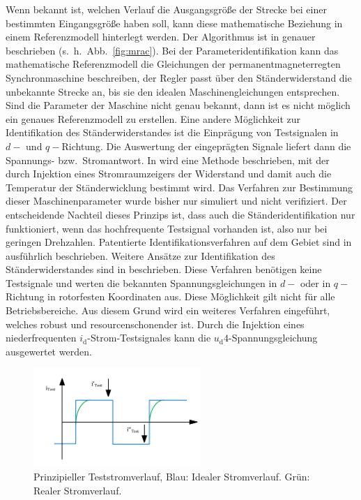 \documentclass[conference,twocolumn]{IEEEtran}
\newcommand{\x}[1]{\mathrm{#1}}
\begin{document}
Wenn bekannt ist, welchen Verlauf die Ausgangsgröße der Strecke bei einer bestimmten Eingangsgröße haben soll, kann diese mathematische Beziehung in einem Referenzmodell hinterlegt werden.
Der Algorithmus ist in \autocite{slotine_applied_1991} genauer beschrieben (s.~h.~Abb.~\ref{fig:mrac}).
Bei der Parameteridentifikation kann das mathematische Referenzmodell die Gleichungen der permanentmagneterregten Synchronmaschine beschreiben, der Regler passt über den Ständerwiderstand die unbekannte Strecke an, bis sie den idealen Maschinengleichungen entsprechen.
Sind die Parameter der Maschine nicht genau bekannt, dann ist es nicht möglich ein genaues Referenzmodell zu erstellen.
Eine andere Möglichkeit zur Identifikation des Ständerwiderstandes ist die Einprägung von Testsignalen in $d-$ und $q-$Richtung.
Die Auswertung der eingeprägten Signale liefert dann die Spannungs- bzw.\ Stromantwort.
In \autocite{wilson2005} wird eine Methode beschrieben, mit der durch Injektion eines Stromraumzeigers der Widerstand und damit auch die Temperatur der Ständerwicklung bestimmt wird.
Das Verfahren zur Bestimmung dieser Maschinenparameter wurde bisher nur simuliert und nicht verifiziert.
Der entscheidende Nachteil dieses Prinzips ist, dass auch die Ständeridentifikation nur funktioniert, wenn das hochfrequente Testsignal vorhanden ist, also nur bei geringen Drehzahlen.
Patentierte Identifikationsverfahren auf dem Gebiet sind in \autocites{schutzrecht1}{schutzrecht2} ausführlich beschrieben.
Weitere Ansätze zur Identifikation des Ständerwiderstandes sind in \textcite{Kellner2012} beschrieben.
Diese Verfahren benötigen keine Testsignale und werten die bekannten Spannungsgleichungen in $d-$ oder in $q-$Richtung in rotorfesten Koordinaten aus.
Diese Möglichkeit gilt nicht für alle Betriebsbereiche. 
Aus diesem Grund wird ein weiteres Verfahren eingeführt, welches robust und resourcenschonender ist.
Durch die Injektion eines niederfrequenten $i_\x{d}$-Strom-Testsignales kann die $u_\x{d}4$-Spannungsgleichung ausgewertet werden.

\begin{figure}[!h]
\centering
\includegraphics[width=2.5in]{img/test-strom}
\caption{Prinzipieller Teststromverlauf, Blau: Idealer Stromverlauf. Grün: Realer Stromverlauf.}
\label{fig:test-strom}
\end{figure}
\end{document}
